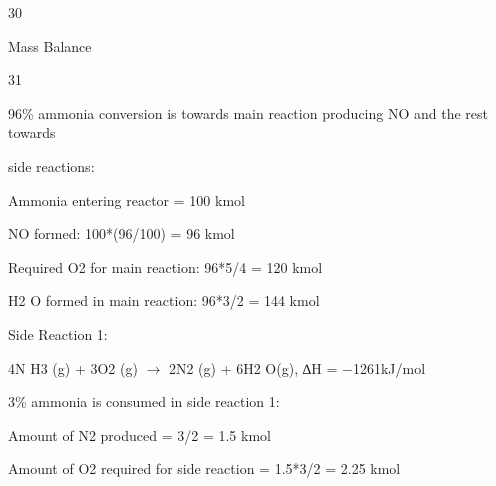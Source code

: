 \documentclass[a4paper,portrait,12pt]{article}
\begin{document}
30





\begin{flushleft}
\newpage
Mass Balance
\end{flushleft}





31





\begin{flushleft}
96\% ammonia conversion is towards main reaction producing NO and the rest towards
\end{flushleft}


\begin{flushleft}
side reactions:
\end{flushleft}


\begin{flushleft}
Ammonia entering reactor = 100 kmol
\end{flushleft}


\begin{flushleft}
NO formed: 100*(96/100) = 96 kmol
\end{flushleft}


\begin{flushleft}
Required O2 for main reaction: 96*5/4 = 120 kmol
\end{flushleft}


\begin{flushleft}
H2 O formed in main reaction: 96*3/2 = 144 kmol
\end{flushleft}


\begin{flushleft}
Side Reaction 1:
\end{flushleft}


\begin{flushleft}
4N H3 (g) + 3O2 (g) $\rightarrow$ 2N2 (g) + 6H2 O(g), ∆H = $-$1261kJ/mol
\end{flushleft}


\begin{flushleft}
3\% ammonia is consumed in side reaction 1:
\end{flushleft}


\begin{flushleft}
Amount of N2 produced = 3/2 = 1.5 kmol
\end{flushleft}


\begin{flushleft}
Amount of O2 required for side reaction = 1.5*3/2 = 2.25 kmol
\end{flushleft}
\end{document}
